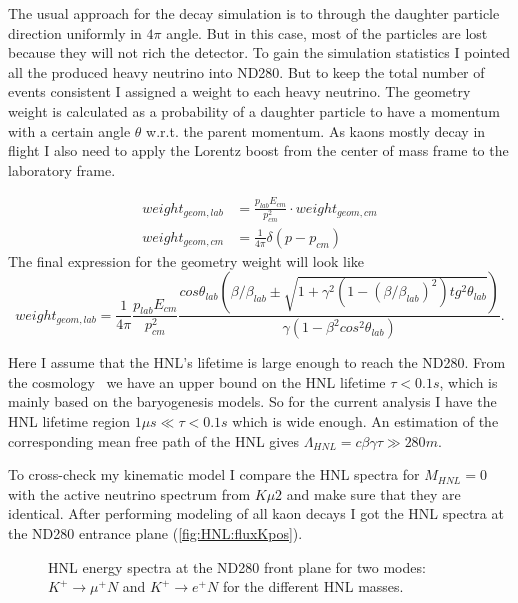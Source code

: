 \documentclass[../main.tex]{subfiles}
\begin{document}
The usual approach for the decay simulation is to through the daughter particle direction uniformly in $4\pi$ angle. But in this case, most of the particles are lost because they will not rich the detector. To gain the simulation statistics I pointed all the produced heavy neutrino into ND280. But to keep the total number of events consistent I assigned a weight to each heavy neutrino. The geometry weight is calculated as a probability of a daughter particle to have a momentum with a certain angle $\theta$ w.r.t. the parent momentum. As kaons mostly decay in flight I also need to apply the Lorentz boost from the center of mass frame to the laboratory frame.

\begin{align}
    weight_{geom, lab}&=\frac{p_{lab}E_{cm}}{p_{cm}^2}\cdot weight_{geom,cm}
    \nonumber \\
    weight_{geom, cm} &= \frac{1}{4\pi}\delta\left(p-p_{cm}\right)
\end{align}
The final expression for the geometry weight will look like
\begin{equation}
    weight_{geom, lab}=\frac{1}{4\pi}\frac{p_{lab}E_{cm}}{p_{cm}^2}\frac{cos\theta_{lab}\left(\beta/\beta_{lab}\pm\sqrt{1+\gamma^2\left(1-\left(\beta/\beta_{lab}\right)^2\right)tg^2\theta_{lab}}\right)}{\gamma\left(1-\beta^{2}cos^{2}\theta_{lab}\right)}.
    \label{eq:HNL:lorentz}
\end{equation}

Here I assume that the HNL's lifetime is large enough to reach the ND280. From the cosmology~\cite{Gorbunov2007} we have an upper bound on the HNL lifetime  $\tau < 0.1s$, which is mainly based on the baryogenesis models. So for the current analysis I have the HNL lifetime region $1\mu s\ll\tau<0.1s$ which is wide enough. An estimation of the corresponding mean free path of the HNL gives $\Lambda_{HNL}=c\beta\gamma\tau\gg280 m$.

To cross-check my kinematic model I compare the HNL spectra for $M_{HNL}=0$ with the active neutrino spectrum from $K\mu2$ and make sure that they are identical. After performing modeling of all kaon decays I got the HNL spectra at the ND280 entrance plane (\autoref{fig:HNL:fluxKpos}).

\begin{figure}[!ht]
    \begin{minipage}{0.49\linewidth}
    \end{minipage}
    \hfill
    \begin{minipage}{0.49\linewidth}
    \end{minipage}
    \caption{HNL energy spectra at the ND280 front plane for two modes: $K^+\rightarrow \mu^+N$ and $K^+\rightarrow e^+N$ for the different HNL masses.}
    \label{fig:HNL:fluxKpos}
\end{figure}
\end{document}

